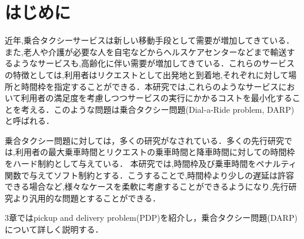\chapter{はじめに}
近年,乗合タクシーサービスは新しい移動手段として需要が増加してきている．また,老人や介護が必要な人を自宅などからヘルスケアセンターなどまで輸送するようなサービスも,高齢化に伴い需要が増加してきている．これらのサービスの特徴としては,利用者はリクエストとして出発地と到着地,それぞれに対して場所と時間枠を指定することができる．本研究では,これらのようなサービスにおいて利用者の満足度を考慮しつつサービスの実行にかかるコストを最小化することを考える．このような問題は乗合タクシー問題(Dial-a-Ride problem, DARP)と呼ばれる．

乗合タクシー問題に対しては，多くの研究がなされている．多くの先行研究では,利用者の最大乗車時間とリクエストの乗車時間と降車時間に対しての時間枠をハード制約として与えている．
本研究では,時間枠及び乗車時間をペナルティ関数で与えてソフト制約とする．こうすることで,時間枠より少しの遅延は許容できる場合など,様々なケースを柔軟に考慮することができるようになり,先行研究より汎用的な問題とすることができる．

3章ではpickup and delivery problem(PDP)を紹介し，乗合タクシー問題(DARP)について詳しく説明する．

